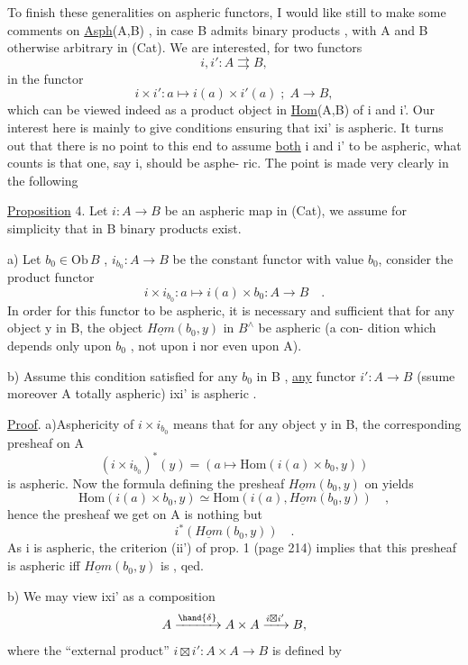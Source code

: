 
To finish these generalities on aspheric functors, I would like still
to make some comments on \uline{Asph}(A,B) , in case B admits binary products ,
with A and B otherwise arbitrary in (Cat). We are interested, for two
functors
\[ i,i' : A \rightrightarrows B , \]
in the functor
\[ i\times i' : a \longmapsto i(a)\times i'(a) \; ; \; A \longrightarrow B , \]
which can be viewed indeed as a product object in \uline{Hom}(A,B) of i and i'.
Our interest here is mainly to give conditions ensuring that ixi' is
aspheric. It turns out that there is no point to this end to assume \uline{both}
i and i' to be aspheric, what counts is that one, say i, should be asphe-%
ric. The point is made very clearly in the following

\uline{Proposition} 4. Let $i: A \longrightarrow B$ be an aspheric 
map in (Cat), we assume for simplicity that in B binary products exist.

a) Let $b_0 \in \mathrm{Ob}\, B$ , $i_{b_0} : A \to B$ be the constant functor with value $b_0$,
consider the product functor
\[ i\times i_{b_0} : a \mapsto i(a)\times b_0 : A \to B \quad . \]
In order for this functor to be aspheric, it is necessary and sufficient
that for any object y in B, the object $\underline{Hom}(b_0,y)$ in $B^\wedge$ be aspheric (a con-%
dition which depends only upon $b_0$ , not upon i nor even upon A).

b) Assume this condition satisfied for any $b_0$ in B ,  
\uline{any} functor $i': A \to B$ \hand{,} (ssume moreover A totally aspheric) 
ixi' is aspheric  .

\uline{Proof}. a)Asphericity of $i\times i_{b_0}$ means that for any object y in B, the
corresponding  presheaf on A
\[ (i\times i_{b_0})^*(y) = ( a \longmapsto \mathrm{Hom}(i(a)\times b_0,y)) \]
is aspheric. Now the formula defining the presheaf $\underline{Hom}(b_0,y)$ on 
yields
\[ \mathrm{Hom}(i(a)\times b_0,y) \simeq \mathrm{Hom}(i(a), \underline{Hom}(b_0,y)) \quad , \]
hence the presheaf we get on A is nothing but
\[ i^*(\underline{Hom}(b_0,y)) \quad . \]
As i is aspheric, the criterion (ii') of prop. 1 (page 214) implies that
this presheaf is aspheric iff $\underline{Hom}(b_0,y)$ is , qed.

b) We may view ixi' as a composition
\[ A \xrightarrow{\hand{\delta}} A\times A \xrightarrow{i\boxtimes i'} B , \]
where the ``external product'' $i\boxtimes i' : A\times A \to B$ is defined by
